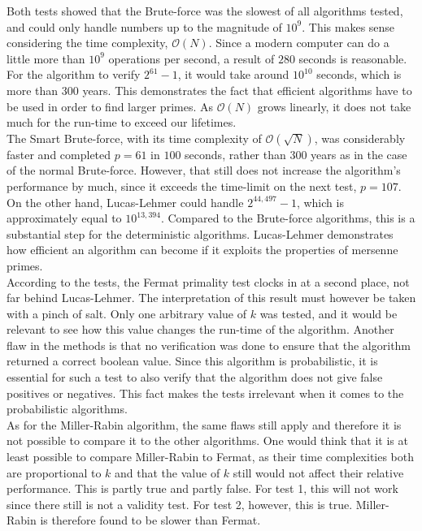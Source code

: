 \documentclass[main.tex]{subfiles}
\begin{document}
Both tests showed that the Brute-force was the slowest of all algorithms
tested, and could only handle numbers up to the magnitude of $10^{9}$. This
makes sense considering the time complexity, $\mathcal{O}(N)$. Since a modern
computer can do a little more than $10^{9}$ operations per second, a result of
$280$ seconds is reasonable. For the algorithm to verify $2^{61}-1$, it would take
around $10^{10}$ seconds, which is more than $300$ years. This demonstrates the
fact that efficient algorithms have to be used in order to find larger primes. As $\mathcal{O}(N)$ grows
linearly, it does not take much for the run-time to exceed our lifetimes. \\

The Smart Brute-force, with its time complexity of $\mathcal{O}(\sqrt{N})$, was
considerably faster and completed $p=61$ in $100$ seconds, rather than $300$
years as in the case of the normal Brute-force. However, that still does not
increase the algorithm's performance by much, since it exceeds the time-limit on
the next test, $p=107$. \\

On the other hand, Lucas-Lehmer could handle $2^{44,497} - 1$, which is approximately
equal to $10^{13,394}$. Compared to the Brute-force algorithms, this is a
substantial step for the deterministic algorithms. Lucas-Lehmer demonstrates
how efficient an algorithm can become if it exploits the properties of mersenne primes. \\

According to the tests, the Fermat primality test clocks in at a second place,
not far behind Lucas-Lehmer. The interpretation of this result must however be
taken with a pinch of salt. Only one arbitrary value of $k$ was tested, and it
would be relevant to see how this value changes the run-time of the algorithm.
Another flaw in the methods is that no verification was done to ensure that the
algorithm returned a correct boolean value. Since this algorithm is
probabilistic, it is essential for such a test to also verify that the algorithm
does not give false positives or negatives. This fact makes the tests
irrelevant when it comes to the probabilistic algorithms. \\

As for the Miller-Rabin algorithm, the same flaws still apply and therefore it
is not possible to compare it to the other algorithms. One would think that it
is at least possible to compare Miller-Rabin to Fermat, as their time
complexities both are proportional to $k$ and that the value of $k$ still would
not affect their relative performance. This is partly true and partly false. For
test 1, this will not work since there still is not a validity test. For test 2,
however, this is true. Miller-Rabin is therefore found to be slower than
Fermat. \\
\end{document}
